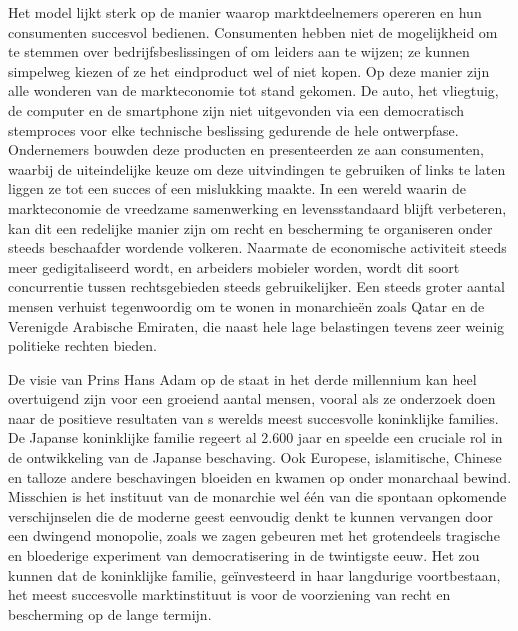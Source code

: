 \documentclass[
  a5paper,
  smalldemyvopaper,11pt,twoside,onecolumn,openright,extrafontsizes,
hidelinks]{memoir}
\begin{document}
Het model lijkt sterk op de manier waarop marktdeelnemers opereren en
hun consumenten succesvol bedienen. Consumenten hebben niet de
mogelijkheid om te stemmen over bedrijfsbeslissingen of om leiders aan
te wijzen; ze kunnen simpelweg kiezen of ze het eindproduct wel of niet
kopen. Op deze manier zijn alle wonderen van de markteconomie tot stand
gekomen. De auto, het vliegtuig, de computer en de smartphone zijn niet
uitgevonden via een democratisch stemproces voor elke technische
beslissing gedurende de hele ontwerpfase. Ondernemers bouwden deze
producten en presenteerden ze aan consumenten, waarbij de uiteindelijke
keuze om deze uitvindingen te gebruiken of links te laten liggen ze tot
een succes of een mislukking maakte. In een wereld waarin de
markteconomie de vreedzame samenwerking en levensstandaard blijft
verbeteren, kan dit een redelijke manier zijn om recht en bescherming te
organiseren onder steeds beschaafder wordende volkeren. Naarmate de
economische activiteit steeds meer gedigitaliseerd wordt, en arbeiders
mobieler worden, wordt dit soort concurrentie tussen rechtsgebieden
steeds gebruikelijker. Een steeds groter aantal mensen verhuist
tegenwoordig om te wonen in monarchieën zoals Qatar en de Verenigde
Arabische Emiraten, die naast hele lage belastingen tevens zeer weinig
politieke rechten bieden.

De visie van Prins Hans Adam op de staat in het derde millennium kan
heel overtuigend zijn voor een groeiend aantal mensen, vooral als ze
onderzoek doen naar de positieve resultaten van s werelds meest
succesvolle koninklijke families. De Japanse koninklijke familie regeert
al 2.600 jaar en speelde een cruciale rol in de ontwikkeling van de
Japanse beschaving. Ook Europese, islamitische, Chinese en talloze
andere beschavingen bloeiden en kwamen op onder monarchaal bewind.
Misschien is het instituut van de monarchie wel één van die spontaan
opkomende verschijnselen die de moderne geest eenvoudig denkt te kunnen
vervangen door een dwingend monopolie, zoals we zagen gebeuren met het
grotendeels tragische en bloederige experiment van democratisering in de
twintigste eeuw. Het zou kunnen dat de koninklijke familie, geïnvesteerd
in haar langdurige voortbestaan, het meest succesvolle marktinstituut is
voor de voorziening van recht en bescherming op de lange termijn.
\end{document}
